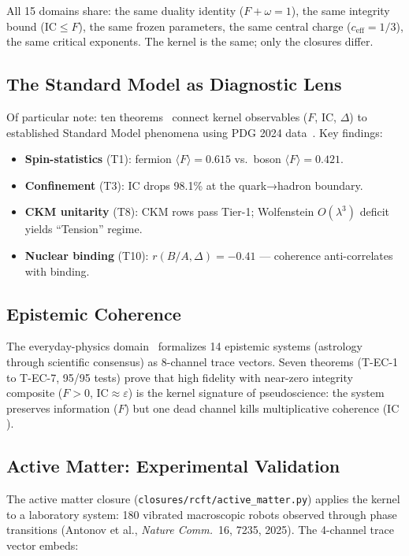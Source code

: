 \documentclass[
  aps,
  prd,
  preprint,
  superscriptaddress,
  nofootinbib,
  floatfix,
  longbibliography
]{revtex4-2}
\newcommand{\eps}{\varepsilon}
\newcommand{\IC}{\mathrm{IC}}
\newcommand{\Fid}{F}
\newcommand{\Drft}{\omega}
\newcommand{\ceff}{c_{\mathrm{eff}}}
\newcommand{\hetgap}{\Delta}
\begin{document}
All 15 domains share:
the same duality identity ($\Fid + \Drft = 1$),
the same integrity bound ($\IC \leq \Fid$),
the same frozen parameters,
the same central charge ($\ceff = 1/3$),
the same critical exponents.
The kernel is the same; only the closures differ.

\subsection{The Standard Model as Diagnostic Lens}

Of particular note:
ten theorems~\cite{paulus2026sm} connect
kernel observables ($\Fid$, $\IC$, $\hetgap$) to established
Standard Model phenomena using
PDG 2024 data~\cite{pdg2024}.
Key findings:

\begin{itemize}[nosep,leftmargin=*]
  \item \textbf{Spin-statistics} (T1): fermion $\langle\Fid\rangle = 0.615$ vs.\
    boson $\langle\Fid\rangle = 0.421$.
  \item \textbf{Confinement} (T3): $\IC$ drops 98.1\% at the
    quark→hadron boundary.
  \item \textbf{CKM unitarity} (T8): CKM rows pass Tier-1;
    Wolfenstein $O(\lambda^3)$ deficit yields ``Tension'' regime.
  \item \textbf{Nuclear binding} (T10):
    $r(B/A, \hetgap) = -0.41$ — coherence anti-correlates
    with binding.
\end{itemize}

\subsection{Epistemic Coherence}

The everyday-physics domain~\cite{paulus2025episteme}
formalizes 14 epistemic systems
(astrology through scientific consensus) as 8-channel
trace vectors.
Seven theorems (T-EC-1 to T-EC-7, 95/95 tests) prove that
high fidelity with near-zero integrity composite
($\Fid > 0$, $\IC \approx \eps$) is the kernel signature of
pseudoscience: the system preserves information ($\Fid$)
but one dead channel kills multiplicative coherence ($\IC$).

\subsection{Active Matter: Experimental Validation}

The active matter closure (\texttt{closures/rcft/active\_matter.py})
applies the kernel to a laboratory system:
180 vibrated macroscopic robots observed through
phase transitions (Antonov et al., \textit{Nature Comm.}\
16, 7235, 2025).
The 4-channel trace vector embeds:
\end{document}
